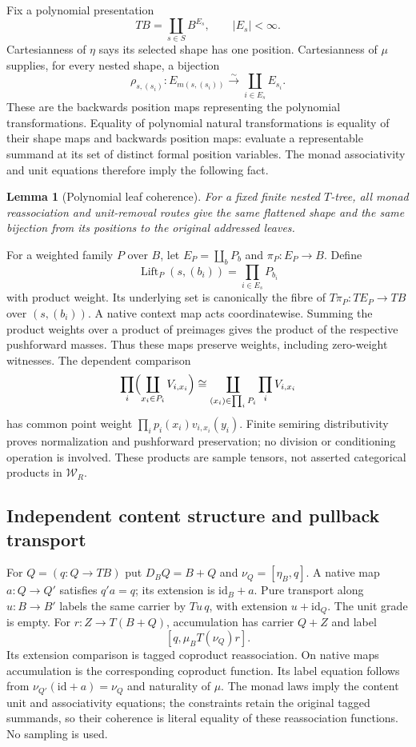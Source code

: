 \documentclass[11pt,a4paper]{article}
\newtheorem{lemma}[theorem]{Lemma}
\theoremstyle{definition}
\newcommand{\W}{\mathcal W_R}
\newcommand{\id}{\mathrm{id}}
\begin{document}
Fix a polynomial presentation
\[
 TB=\coprod_{s\in S}B^{E_s},\qquad |E_s|<\infty.
\]
Cartesianness of $\eta$ says its selected shape has one position.
Cartesianness of $\mu$ supplies, for every nested shape,
a bijection
\[
 \rho_{s,(s_i)}:E_{m(s,(s_i))}\xrightarrow{\sim}
                 \coprod_{i\in E_s}E_{s_i}.
\]
These are the backwards position maps representing the polynomial
transformations. Equality of polynomial natural transformations is equality
of their shape maps and backwards position maps: evaluate a representable
summand at its set of distinct formal position variables. The monad
associativity and unit equations therefore imply the following fact.

\begin{lemma}[Polynomial leaf coherence]\label{xc:leaves}
For a fixed finite nested $T$-tree, all monad reassociation and unit-removal
routes give the same flattened shape and the same bijection from its
positions to the original addressed leaves.
\end{lemma}

For a weighted family $P$ over $B$, let
$E_P=\coprod_bP_b$ and $\pi_P:E_P\to B$. Define
\[
 \operatorname{Lift}_P(s,(b_i))=\prod_{i\in E_s}P_{b_i}
\]
with product weight. Its underlying set is canonically the fibre of
$T\pi_P:TE_P\to TB$ over $(s,(b_i))$. A native context map acts
coordinatewise. Summing the product weights over a product of preimages
gives the product of the respective pushforward masses. Thus these maps
preserve weights, including zero-weight witnesses. The dependent comparison
\begin{equation}\label{xc:fubini}
 \prod_i\Bigl(\coprod_{x_i\in P_i}V_{i,x_i}\Bigr)
 \cong
 \coprod_{(x_i)\in\prod_iP_i}\prod_iV_{i,x_i}
\end{equation}
has common point weight
$\prod_i p_i(x_i)v_{i,x_i}(y_i)$. Finite semiring distributivity proves
normalization and pushforward preservation; no division or conditioning
operation is involved. These products are sample tensors, not asserted
categorical products in $\W$.

\subsection{Independent content structure and pullback transport}

For $Q=(q:Q\to TB)$ put $D_BQ=B+Q$ and
$\nu_Q=[\eta_B,q]$. A native map $a:Q\to Q'$ satisfies $q'a=q$;
its extension is $\id_B+a$. Pure transport along $u:B\to B'$ labels
the same carrier by $Tu\,q$, with extension $u+\id_Q$. The unit grade
is empty. For $r:Z\to T(B+Q)$, accumulation has carrier $Q+Z$ and label
\[
 [q,\mu_BT(\nu_Q)r].
\]
Its extension comparison is tagged coproduct reassociation. On native
maps accumulation is the corresponding coproduct function. Its label
equation follows from $\nu_{Q'}(\id+a)=\nu_Q$ and naturality of $\mu$.
The monad laws imply the content unit and associativity equations; the
constraints retain the original tagged summands, so their coherence is
literal equality of these reassociation functions. No sampling is used.
\end{document}
